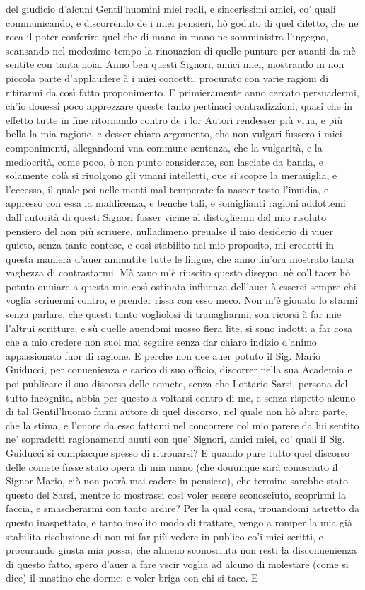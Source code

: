 \documentclass[11pt,twoside,openany]{book}
\begin{document}
del giudicio d'alcuni Gentil'huomini miei reali, e sincerissimi amici, co' quali communicando, e discorrendo de i miei pensieri, hò goduto di quel diletto, che ne reca il poter conferire quel che di mano in mano ne somministra l'ingegno, scansando nel medesimo tempo la rinouazion di quelle punture per auanti da mè sentite con tanta noia. Anno ben questi Signori, amici miei, mostrando in non piccola parte d'applaudere à i miei concetti, procurato con varie ragioni di ritirarmi da così fatto proponimento. E primieramente anno cercato persuadermi, ch'io douessi poco apprezzare queste tanto pertinaci contradizzioni, quasi che in effetto tutte in fine ritornando contro de i lor Autori rendesser più viua, e più bella la mia ragione, e desser chiaro argomento, che non vulgari fussero i miei componimenti, allegandomi vna commune sentenza, che la vulgarità, e la mediocrità, come poco, ò non punto considerate, son lasciate da banda, e solamente colà si riuolgono gli vmani intelletti, oue si scopre la merauiglia, e l'eccesso, il quale poi nelle menti mal temperate fa nascer tosto l'inuidia, e appresso con essa la maldicenza, e benche tali, e somiglianti ragioni addottemi dall'autorità di questi Signori fusser vicine al distogliermi dal mio risoluto pensiero del non più scriuere, nulladimeno preualse il mio desiderio di viuer quieto, senza tante contese, e così stabilito nel mio proposito, mi credetti in questa maniera d'auer ammutite tutte le lingue, che anno fin'ora mostrato tanta vaghezza di contrastarmi. Mà vano m'è riuscito questo disegno, nè co'l tacer hò potuto ouuiare a questa mia così ostinata influenza dell'auer à esserci sempre chi voglia scriuermi contro, e prender rissa con esso meco. Non m'è giouato lo starmi senza parlare, che questi tanto vogliolosi di trauagliarmi, son ricorsi à far mie l'altrui scritture; e sù quelle auendomi mosso fiera lite, si sono indotti a far cosa che a mio credere non suol mai seguire senza dar chiaro indizio d'animo appassionato fuor di ragione. E perche non dee auer potuto il Sig. Mario Guiducci, per conuenienza e carico di suo officio, discorrer nella sua Academia e poi publicare il suo discorso delle comete, senza che Lottario Sarsi, persona del tutto incognita, abbia per questo a voltarsi contro di me, e senza rispetto alcuno di tal Gentil'huomo farmi autore di quel discorso, nel quale non hò altra parte, che la stima, e l'onore da esso fattomi nel concorrere col mio parere da lui sentito ne' sopradetti ragionamenti auuti con que' Signori, amici miei, co' quali il Sig. Guiducci si compiacque spesso di ritrouarsi? E quando pure tutto quel discorso delle comete fusse stato opera di mia mano (che douunque sarà conosciuto il Signor Mario, ciò non potrà mai cadere in pensiero), che termine sarebbe stato questo del Sarsi, mentre io mostrassi così voler essere sconosciuto, scoprirmi la faccia, e smascherarmi con tanto ardire? Per la qual cosa, trouandomi astretto da questo inaspettato, e tanto insolito modo di trattare, vengo a romper la mia già stabilita risoluzione di non mi far più vedere in publico co'i miei scritti, e procurando giusta mia possa, che almeno sconosciuta non resti la disconuenienza di questo fatto, spero d'auer a fare vscir voglia ad alcuno di molestare (come si dice) il mastino che dorme; e voler briga con chi si tace. E 
\end{document}
